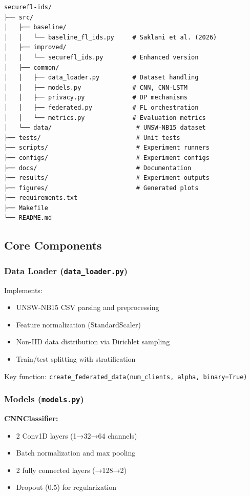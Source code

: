 \begin{verbatim}
securefl-ids/
├── src/
│   ├── baseline/
│   │   └── baseline_fl_ids.py     # Saklani et al. (2026)
│   ├── improved/
│   │   └── securefl_ids.py        # Enhanced version
│   ├── common/
│   │   ├── data_loader.py         # Dataset handling
│   │   ├── models.py              # CNN, CNN-LSTM
│   │   ├── privacy.py             # DP mechanisms
│   │   ├── federated.py           # FL orchestration
│   │   └── metrics.py             # Evaluation metrics
│   └── data/                       # UNSW-NB15 dataset
├── tests/                          # Unit tests
├── scripts/                        # Experiment runners
├── configs/                        # Experiment configs
├── docs/                           # Documentation
├── results/                        # Experiment outputs
├── figures/                        # Generated plots
├── requirements.txt
├── Makefile
└── README.md
\end{verbatim}

\subsection{Core Components}

\subsubsection{Data Loader (\texttt{data\_loader.py})}

Implements:
\begin{itemize}
    \item UNSW-NB15 CSV parsing and preprocessing
    \item Feature normalization (StandardScaler)
    \item Non-IID data distribution via Dirichlet sampling
    \item Train/test splitting with stratification
\end{itemize}

Key function: \texttt{create\_federated\_data(num\_clients, alpha, binary=True)}

\subsubsection{Models (\texttt{models.py})}

\textbf{CNNClassifier:}
\begin{itemize}
    \item 2 Conv1D layers (1→32→64 channels)
    \item Batch normalization and max pooling
    \item 2 fully connected layers (→128→2)
    \item Dropout (0.5) for regularization
\end{itemize}

